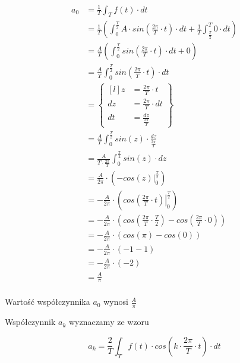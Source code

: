 \begin{align*}
a_0&=\frac{1}{T}\int_{T}f(t) \cdot dt\\
&=\frac{1}{T}\left(\int_{0}^{\frac{T}{2}}A \cdot sin\left( \frac{2\pi}{T} \cdot t\right) \cdot dt 
+ \frac{1}{T}\int_{\frac{T}{2}}^{T}0 \cdot dt \right)\\
&=\frac{A}{T}\left(\int_{0}^{\frac{T}{2}}sin\left( \frac{2\pi}{T} \cdot t\right) \cdot dt 
+ 0 \right)\\
&=\frac{A}{T}\int_{0}^{\frac{T}{2}}sin\left( \frac{2\pi}{T} \cdot t\right) \cdot dt\\
&=\begin{Bmatrix*}[l]
z&=\frac{2\pi}{T} \cdot t\\
dz&=\frac{2\pi}{T} \cdot dt\\
dt&=\frac{dz}{\frac{2\pi}{T}}
\end{Bmatrix*}\\
&=\frac{A}{T}\int_{0}^{\frac{T}{2}}sin\left( z\right) \cdot \frac{dz}{\frac{2\pi}{T}}\\
&=\frac{A}{T\cdot \frac{2\pi}{T}}\int_{0}^{\frac{T}{2}}sin\left( z\right) \cdot dz\\
&=\frac{A}{2\pi}\cdot \left(\left . -cos\left( z\right) \right|_{0}^{\frac{T}{2}}\right)\\
&=-\frac{A}{2\pi}\cdot \left(\left . cos\left( \frac{2\pi}{T} \cdot t\right) \right|_{0}^{\frac{T}{2}}\right)\\
&=-\frac{A}{2\pi}\cdot \left( cos\left( \frac{2\pi}{T} \cdot \frac{T}{2}\right) - cos\left( \frac{2\pi}{T} \cdot 0\right)\right)\\
&=-\frac{A}{2\pi}\cdot \left( cos\left( \pi\right) - cos\left( 0\right)\right)\\
&=-\frac{A}{2\pi}\cdot \left( -1 - 1\right)\\
&=-\frac{A}{2\pi}\cdot \left( -2\right)\\
&=\frac{A}{\pi}\\
\end{align*}

Wartość współczynnika $a_0$ wynosi $\frac{A}{\pi}$

Współczynnik $a_k$ wyznaczamy ze wzoru

\begin{equation}
a_k=\frac{2}{T}\int_{T}f(t) \cdot cos\left( k \cdot \frac{2\pi}{T} \cdot t\right) \cdot dt
\end{equation}

